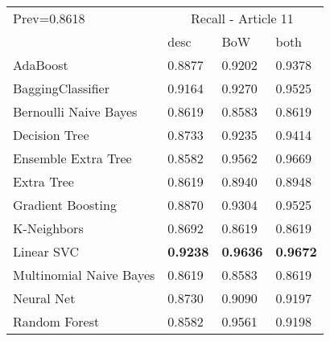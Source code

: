 \begin{tabular}{|l|l|l|l| }
\hline
Prev=0.8618 &  \multicolumn{3}{c|}{Recall - Article 11} \\
\cline{2-4} & desc & BoW & both \\ \hline
AdaBoost                & 0.8877 & 0.9202 & 0.9378\\
BaggingClassifier       & 0.9164 & 0.9270 & 0.9525\\
Bernoulli Naive Bayes   & 0.8619 & 0.8583 & 0.8619\\
Decision Tree           & 0.8733 & 0.9235 & 0.9414\\
Ensemble Extra Tree     & 0.8582 & 0.9562 & 0.9669\\
Extra Tree              & 0.8619 & 0.8940 & 0.8948\\
Gradient Boosting       & 0.8870 & 0.9304 & 0.9525\\
K-Neighbors             & 0.8692 & 0.8619 & 0.8619\\
Linear SVC              & {\bf 0.9238} & {\bf 0.9636} & {\bf 0.9672}\\
Multinomial Naive Bayes & 0.8619 & 0.8583 & 0.8619\\
Neural Net              & 0.8730 & 0.9090 & 0.9197\\
Random Forest           & 0.8582 & 0.9561 & 0.9198\\
\hline
\end{tabular}